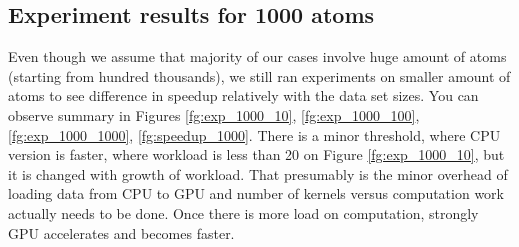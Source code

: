 \documentclass[11pt,a4paper]{report}
\begin{document}
\subsection{Experiment results for 1000 atoms}

Even though we assume that majority of our cases involve huge amount of atoms (starting from hundred thousands), we still ran experiments on smaller amount of atoms to see difference in speedup relatively with the data set sizes. You can observe summary in Figures \ref{fg:exp_1000_10}, \ref{fg:exp_1000_100}, \ref{fg:exp_1000_1000}, \ref{fg:speedup_1000}. There is a minor threshold, where CPU version is faster, where workload is less than 20 on Figure \ref{fg:exp_1000_10}, but it is changed with growth of workload. That presumably is the minor overhead of loading data from CPU to GPU and number of kernels versus computation work actually needs to be done. Once there is more load on computation, strongly GPU accelerates and becomes faster.
\end{document}
